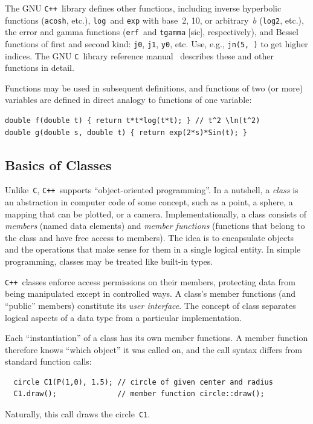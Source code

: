 \documentclass[12pt]{report}
\newcommand{\code}[1]{\texttt{#1}}
\newcommand{\C}{\code{C}}
\newcommand{\CXX}{\code{C++}}
\begin{document}
The GNU \CXX\ library defines other functions, including inverse
hyperbolic functions (\code{acosh}, etc.), \code{log}~and \code{exp}
with base~2, 10, or arbitrary~$b$ (\code{log2}, etc.), the error and
gamma functions (\code{erf}~and \code{tgamma} [sic], respectively),
and Bessel functions of first and second kind: \code{j0}, \code{j1},
\code{y0}, etc. Use, e.g., \code{jn(5,\ )} to get higher indices.
The GNU \C~library reference manual~\cite{GNUC} describes these and other
functions in detail.

Functions may be used in subsequent definitions, and functions of two
(or more) variables are defined in direct analogy to functions of one
variable:
\begin{verbatim}
double f(double t) { return t*t*log(t*t); } // t^2 \ln(t^2)
double g(double s, double t) { return exp(2*s)*Sin(t); }
\end{verbatim}


\subsection*{Basics of Classes}

Unlike~\code{C}, \CXX\ supports ``object-oriented programming''. In a
nutshell, a \emph{class} is an abstraction in computer code of some
concept, such as a point, a sphere, a mapping that can be plotted, or
a camera. Implementationally, a class consists of \emph{members}
(named data elements) and \emph{member functions} (functions that
belong to the class and have free access to members).  The idea is to
encapsulate objects and the operations that make sense for them in a
single logical entity.  In simple programming, classes may be treated
like built-in types.

\CXX\ classes enforce access permissions on their members, protecting
data from being manipulated except in controlled ways. A class's
member functions (and ``public'' members) constitute its \emph{user
  interface}. The concept of class separates logical aspects of a data
type from a particular implementation.

Each ``instantiation'' of a class has its own member functions.
A member function therefore knows ``which object'' it was called on,
and the call syntax differs from standard function calls:
\begin{verbatim}
  circle C1(P(1,0), 1.5); // circle of given center and radius
  C1.draw();              // member function circle::draw();
\end{verbatim}
Naturally, this call draws the circle~\code{C1}.
\end{document}
